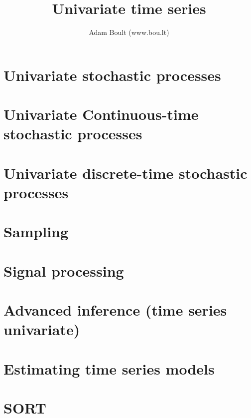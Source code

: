 \documentclass[oneside]{book}
\begin{document}
\author{Adam Boult (www.bou.lt)}
\title{Univariate time series}
\maketitle

\setcounter{tocdepth}{0}
\tableofcontents



\part{Univariate stochastic processes}







\part{Univariate Continuous-time stochastic processes}



\part{Univariate discrete-time stochastic processes}



\part{Sampling}




\part{Signal processing}






\part{Advanced inference (time series univariate)}


\part{Estimating time series models}






\part{SORT}

\end{document}

